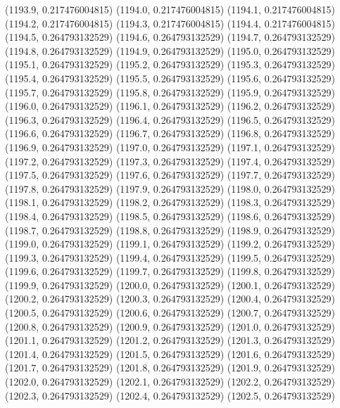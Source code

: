 {					(1193.9, 0.217476004815)
					(1194.0, 0.217476004815)
					(1194.1, 0.217476004815)
					(1194.2, 0.217476004815)
					(1194.3, 0.217476004815)
					(1194.4, 0.217476004815)
					(1194.5, 0.264793132529)
					(1194.6, 0.264793132529)
					(1194.7, 0.264793132529)
					(1194.8, 0.264793132529)
					(1194.9, 0.264793132529)
					(1195.0, 0.264793132529)
					(1195.1, 0.264793132529)
					(1195.2, 0.264793132529)
					(1195.3, 0.264793132529)
					(1195.4, 0.264793132529)
					(1195.5, 0.264793132529)
					(1195.6, 0.264793132529)
					(1195.7, 0.264793132529)
					(1195.8, 0.264793132529)
					(1195.9, 0.264793132529)
					(1196.0, 0.264793132529)
					(1196.1, 0.264793132529)
					(1196.2, 0.264793132529)
					(1196.3, 0.264793132529)
					(1196.4, 0.264793132529)
					(1196.5, 0.264793132529)
					(1196.6, 0.264793132529)
					(1196.7, 0.264793132529)
					(1196.8, 0.264793132529)
					(1196.9, 0.264793132529)
					(1197.0, 0.264793132529)
					(1197.1, 0.264793132529)
					(1197.2, 0.264793132529)
					(1197.3, 0.264793132529)
					(1197.4, 0.264793132529)
					(1197.5, 0.264793132529)
					(1197.6, 0.264793132529)
					(1197.7, 0.264793132529)
					(1197.8, 0.264793132529)
					(1197.9, 0.264793132529)
					(1198.0, 0.264793132529)
					(1198.1, 0.264793132529)
					(1198.2, 0.264793132529)
					(1198.3, 0.264793132529)
					(1198.4, 0.264793132529)
					(1198.5, 0.264793132529)
					(1198.6, 0.264793132529)
					(1198.7, 0.264793132529)
					(1198.8, 0.264793132529)
					(1198.9, 0.264793132529)
					(1199.0, 0.264793132529)
					(1199.1, 0.264793132529)
					(1199.2, 0.264793132529)
					(1199.3, 0.264793132529)
					(1199.4, 0.264793132529)
					(1199.5, 0.264793132529)
					(1199.6, 0.264793132529)
					(1199.7, 0.264793132529)
					(1199.8, 0.264793132529)
					(1199.9, 0.264793132529)
					(1200.0, 0.264793132529)
					(1200.1, 0.264793132529)
					(1200.2, 0.264793132529)
					(1200.3, 0.264793132529)
					(1200.4, 0.264793132529)
					(1200.5, 0.264793132529)
					(1200.6, 0.264793132529)
					(1200.7, 0.264793132529)
					(1200.8, 0.264793132529)
					(1200.9, 0.264793132529)
					(1201.0, 0.264793132529)
					(1201.1, 0.264793132529)
					(1201.2, 0.264793132529)
					(1201.3, 0.264793132529)
					(1201.4, 0.264793132529)
					(1201.5, 0.264793132529)
					(1201.6, 0.264793132529)
					(1201.7, 0.264793132529)
					(1201.8, 0.264793132529)
					(1201.9, 0.264793132529)
					(1202.0, 0.264793132529)
					(1202.1, 0.264793132529)
					(1202.2, 0.264793132529)
					(1202.3, 0.264793132529)
					(1202.4, 0.264793132529)
					(1202.5, 0.264793132529)
}
